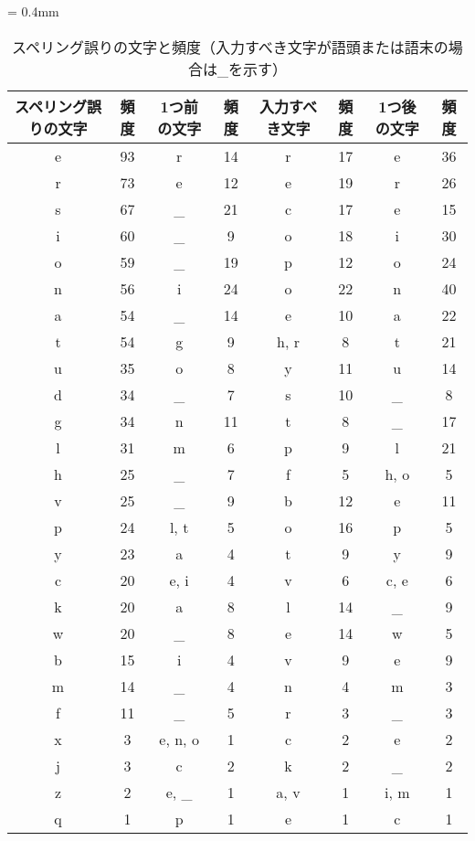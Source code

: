 {\tabcolsep = 0.4mm
 \begin{table*}[t]
  \small
  \begin{center}
   \caption{スペリング誤りの文字と頻度（入力すべき文字が語頭または語末の場合は\_を示す）}
   \begin{tabular}{|c|c|c|c|c|c|c|c|} \hline
       	スペリング誤りの文字 & 頻度 & 1つ前の文字 & 頻度 & 入力すべき文字 & 頻度 & 1つ後の文字 & 頻度\\ \hline
	    e & 93 & r & 14 & r & 17 & e & 36\\ \hline
	    r & 73 & e & 12 & e & 19 & r & 26\\ \hline
	    s & 67 & \_ & 21 & c & 17 & e & 15\\ \hline
	    i & 60 & \_ & 9 & o & 18 & i & 30\\ \hline
	    o & 59 & \_ & 19 & p & 12 & o & 24\\ \hline
	    n & 56 & i & 24 & o & 22 & n & 40\\ \hline
	    a & 54 & \_ & 14 & e & 10 & a & 22\\ \hline
	    t & 54 & g & 9 & h, r & 8 & t & 21\\ \hline
	    u & 35 & o & 8 & y & 11 & u & 14\\ \hline
	    d & 34 & \_ & 7 & s & 10 & \_ & 8\\ \hline
	    g & 34 & n & 11 & t & 8 & \_ & 17\\ \hline
	    l & 31 & m & 6 & p & 9 & l & 21\\ \hline
	    h & 25 & \_ & 7 & f & 5 & h, o & 5\\ \hline
	    v & 25 & \_ & 9 & b & 12 & e & 11\\ \hline
	    p & 24 & l, t & 5 & o & 16 & p & 5\\ \hline
	    y & 23 & a & 4 & t & 9 & y & 9\\ \hline
	    c & 20 & e, i & 4 & v & 6 & c, e & 6\\ \hline
	    k & 20 & a & 8 & l & 14 & \_ & 9\\ \hline
	    w & 20 & \_ & 8 & e & 14 & w & 5\\ \hline
	    b & 15 & i & 4 & v & 9 & e & 9\\ \hline
	    m & 14 & \_ & 4 & n & 4 & m & 3\\ \hline
	    f & 11 & \_ & 5 & r & 3 & \_ & 3\\ \hline
	    x & 3 & e, n, o & 1 & c & 2 & e & 2\\ \hline
	    j & 3 & c & 2 & k & 2 & \_ & 2\\ \hline
	    z & 2 & e, \_ & 1 & a, v & 1 & i, m & 1\\ \hline
	    q & 1 & p & 1 & e & 1 & c & 1\\ \hline
   \end{tabular}
  \end{center}
 \end{table*}
}
 
